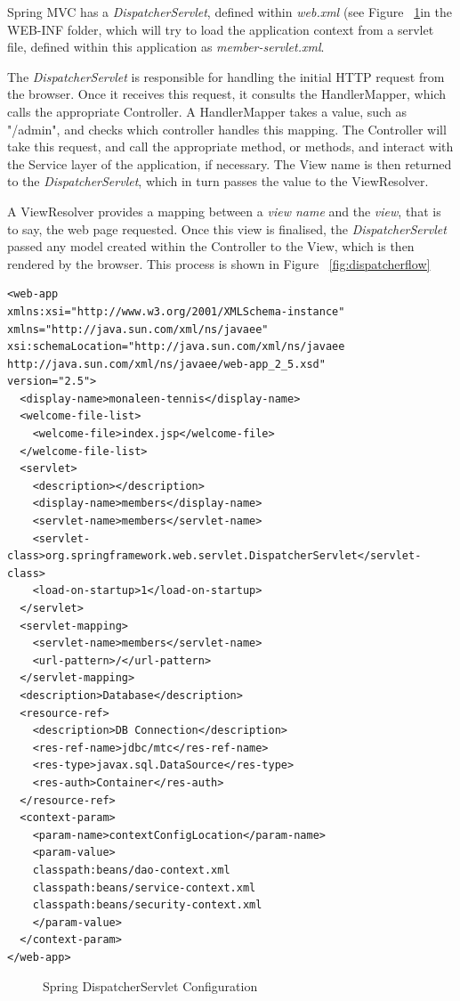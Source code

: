 Spring MVC has a \textit{DispatcherServlet}, defined within \textit{web.xml} (see Figure ~\ref{fig:webxml}in the WEB-INF folder, which will try to load the application context from a servlet file, defined within this application as \textit{member-servlet.xml}. 

The \textit{DispatcherServlet} is responsible for handling the initial HTTP request from the browser. Once it receives this request, it consults the HandlerMapper, which calls the appropriate Controller. A HandlerMapper takes a value, such as "/admin", and checks which controller handles this mapping. The Controller will take this request, and call the appropriate method, or methods, and interact with the Service layer of the application, if necessary. The View name is then returned to the \textit{DispatcherServlet}, which in turn passes the value to the ViewResolver. 

A ViewResolver provides a mapping between a \textit{view name} and the \textit{view}, that is to say, the web page requested. Once this view is finalised, the \textit{DispatcherServlet} passed any model created within the Controller to the View, which is then rendered by the browser. This process is shown in Figure ~\ref{fig:dispatcherflow}


\begin{lstlisting}
<web-app 
xmlns:xsi="http://www.w3.org/2001/XMLSchema-instance" 
xmlns="http://java.sun.com/xml/ns/javaee" 
xsi:schemaLocation="http://java.sun.com/xml/ns/javaee http://java.sun.com/xml/ns/javaee/web-app_2_5.xsd" 
version="2.5">
  <display-name>monaleen-tennis</display-name>
  <welcome-file-list>
    <welcome-file>index.jsp</welcome-file>
  </welcome-file-list>
  <servlet>
    <description></description>
    <display-name>members</display-name>
    <servlet-name>members</servlet-name>
    <servlet-class>org.springframework.web.servlet.DispatcherServlet</servlet-class>
    <load-on-startup>1</load-on-startup>
  </servlet>
  <servlet-mapping>
    <servlet-name>members</servlet-name>
    <url-pattern>/</url-pattern>
  </servlet-mapping>
  <description>Database</description>
  <resource-ref>
    <description>DB Connection</description>
    <res-ref-name>jdbc/mtc</res-ref-name>
    <res-type>javax.sql.DataSource</res-type>
    <res-auth>Container</res-auth>
  </resource-ref>
  <context-param>
    <param-name>contextConfigLocation</param-name>
    <param-value>
	classpath:beans/dao-context.xml
	classpath:beans/service-context.xml
	classpath:beans/security-context.xml
	</param-value>
  </context-param>
</web-app>
\end{lstlisting}
\begin{figure}[H]
\caption{Spring DispatcherServlet Configuration}
\label{fig:webxml}
\end{figure}

